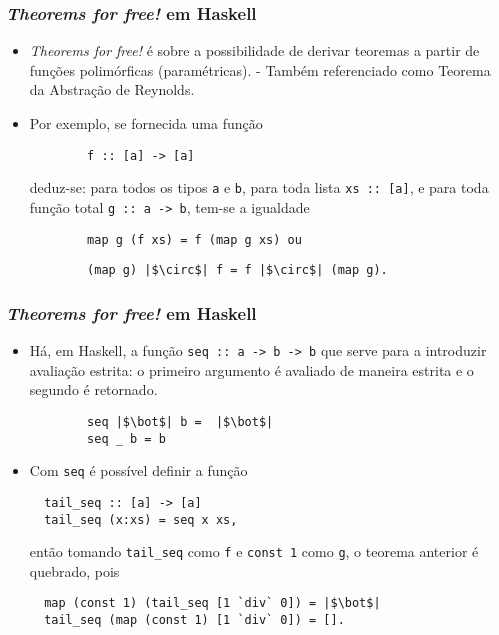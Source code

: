 \documentclass{beamer}
\begin{document}
  \begin{frame}[fragile]
    \frametitle{\textit{Theorems for free!} em Haskell}
    \begin{itemize}
      \item \textit{Theorems for free!} \'e sobre a possibilidade de derivar teoremas a partir
        de fun\c{c}\~oes polim\'orficas (param\'etricas). - Tamb\'em referenciado como Teorema
        da Abstra\c{c}\~ao de Reynolds.
        \pause
      \item Por exemplo, se fornecida uma fun\c{c}\~ao
      \begin{verbatim}
        f :: [a] -> [a]
      \end{verbatim}
    deduz-se: para todos os tipos \texttt{a} e \texttt{b}, para
      toda lista \texttt{xs :: [a]}, e para toda fun\c{c}\~ao total \texttt{g :: a -> b},
        tem-se a igualdade
      \begin{verbatim}
        map g (f xs) = f (map g xs) ou
      \end{verbatim}
      \begin{verbatim}
        (map g) |$\circ$| f = f |$\circ$| (map g).
      \end{verbatim}

    \end{itemize}
  \end{frame}

  \begin{frame}[fragile]
    \frametitle{\textit{Theorems for free!} em Haskell}
    \begin{itemize}
      \item H\'a, em Haskell, a fun\c{c}\~ao \texttt{seq :: a -> b -> b} que serve para a introduzir 
        avalia\c{c}\~ao estrita: o primeiro argumento \'e avaliado de maneira estrita e o segundo \'e retornado.
      \begin{verbatim}
        seq |$\bot$| b =  |$\bot$|
        seq _ b = b
      \end{verbatim}
      \pause
        \item
          Com \texttt{seq} \'e poss\'ivel definir a fun\c{c}\~ao 
\begin{verbatim}
  tail_seq :: [a] -> [a]
  tail_seq (x:xs) = seq x xs,
\end{verbatim}
ent\~ao tomando \texttt{tail_seq} como \texttt{f} e \texttt{const 1} como \texttt{g},
o teorema anterior \'e quebrado, pois
\begin{verbatim}
  map (const 1) (tail_seq [1 `div` 0]) = |$\bot$|
  tail_seq (map (const 1) [1 `div` 0]) = [].
\end{verbatim}


      \end{itemize}
  \end{frame}
\end{document}
